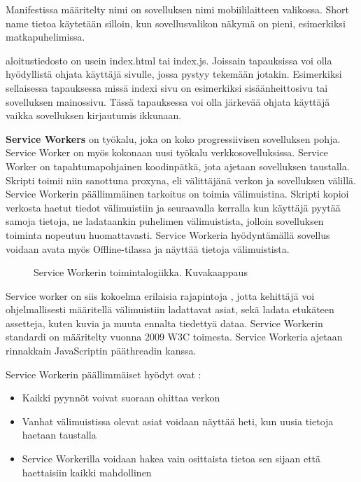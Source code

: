 \documentclass{tktltiki}
\begin{document}
Manifestissa määritelty nimi on sovelluksen nimi mobiililaitteen valikossa. Short name tietoa käytetään silloin, kun sovellusvalikon näkymä on pieni, esimerkiksi matkapuhelimissa.

aloitustiedosto on usein index.html tai index.js. Joissain tapauksissa voi olla hyödyllistä ohjata käyttäjä sivulle, jossa pystyy tekemään jotakin. Esimerkiksi sellaisessa tapauksessa missä indexi sivu on esimerkiksi sisäänheittosivu tai sovelluksen mainossivu. Tässä tapauksessa voi olla järkevää ohjata käyttäjä vaikka sovelluksen kirjautumis ikkunaan.

\clearpage

\textbf{Service Workers} on työkalu, joka on koko progressiivisen sovelluksen pohja. Service Worker on myös kokonaan uusi työkalu verkkosovelluksissa. Service Worker on tapahtumapohjainen koodinpätkä, jota ajetaan sovelluksen taustalla. Skripti toimii niin sanottuna proxyna, eli välittäjänä verkon ja sovelluksen välillä. Service Workerin päällimmäinen tarkoitus on toimia välimuistina. Skripti kopioi verkosta haetut tiedot välimuistiin ja seuraavalla kerralla kun käyttäjä pyytää samoja tietoja, ne ladataankin puhelimen välimuistista, jolloin sovelluksen toiminta nopeutuu huomattavasti. Service Workeria hyödyntämällä sovellus voidaan avata myös Offline-tilassa ja näyttää tietoja välimuistista. 

\begin{figure}[h]
\begin{center}
\caption{Service Workerin toimintalogiikka. Kuvakaappaus \cite{GoogleDevSummit} }
\label{Service workerin toiminta}
\end{center}
\end{figure}
\clearpage

Service worker on siis kokoelma erilaisia rajapintoja \cite{malavolta2017assessing}, jotta kehittäjä voi ohjelmallisesti määritellä välimuistiin ladattavat asiat, sekä ladata etukäteen assetteja, kuten kuvia ja muuta ennalta tiedettyä dataa. Service Workerin standardi on määritelty vuonna 2009 W3C toimesta. Service Workeria ajetaan rinnakkain JavaScriptin pääthreadin kanssa.

Service Workerin päällimmäiset hyödyt ovat \cite{GoogleDevSummit}:

\begin{itemize}
  \item Kaikki pyynnöt voivat suoraan ohittaa verkon
  \item Vanhat välimuistissa olevat asiat voidaan näyttää heti, kun uusia tietoja haetaan taustalla
  \item Service Workerilla voidaan hakea vain osittaista tietoa sen sijaan että haettaisiin kaikki mahdollinen
\end{itemize}
\end{document}
